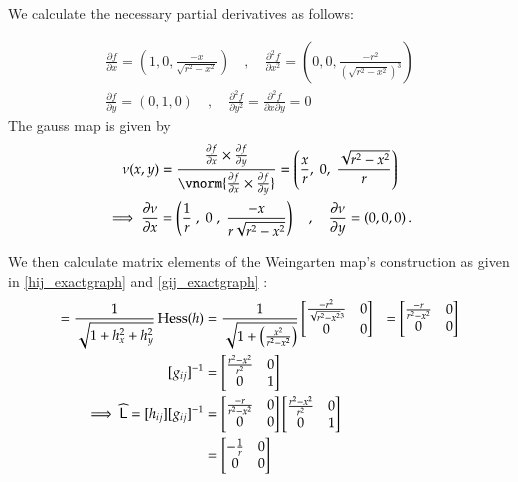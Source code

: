       We calculate the necessary partial derivatives as follows:
      
      \begin{gather}
      \frac{\partial f}{\partial x} = \left(1, 0, \frac{-x}{\sqrt{r^2 - x^2}}\right)
      \quad , \quad
      \frac{\partial^2 f}{\partial x^2} = \left(0, 0, \frac{-r^2}{\left(\sqrt{r^2 - x^2}\right)^3}\right) \\
      \frac{\partial f}{\partial y} = \left(0, 1, 0\right)
      \quad , \quad
      \frac{\partial^2 f}{\partial y^2} = \frac{\partial^2 f}{\partial x \partial y} = 0
      \end{gather}
      The gauss map is given by
      \begin{gather}
      \nu(x,y) = \frac{\frac{\partial f}{\partial x} \times \frac{\partial f}{\partial y}}
      {\vnorm{\frac{\partial f}{\partial x} \times \frac{\partial f}{\partial y}}}
      = \left( \frac{x}{r} ,\; 0 ,\; \frac{\sqrt{r^2 - x^2}}{r} \right) \\
	  \implies
	  \frac{\partial \nu}{\partial x}
		  = \left(\frac{1}{r} \;,\; 0\;,\; \frac{-x}{r\sqrt{r^2-x^2}}\right)
		  \quad , \quad \frac{\partial \nu}{\partial y} = \left(0,0,0\right).
      \end{gather}
      
      We then calculate matrix elements of the Weingarten map's construction as given in
      \cref{hij_exactgraph} and \cref{gij_exactgraph} :
      \begin{align}
      [h_{ij}] = \frac{1}{\sqrt{1+h_x^2 + h_y^2}} \,  \Hess (h)
		       &= \frac{1}{\sqrt{1+\left(\frac{x^2}{r^2-x^2}\right)}}
		       \begin{bmatrix}
		       \frac{-r^2}{\sqrt{r^2 - x^2}^3} & 0 \\
			     0 & 0
		       \end{bmatrix} 
		       &= \begin{bmatrix}
		       \frac{-r}{r^2 - x^2} & 0 \\
		       0 & 0
		       \end{bmatrix} \\
		       [g_{ij}]^{-1} &= \begin{bmatrix} \frac{r^2 - x^2}{r^2} & 0 \\ 0 & 1 \end{bmatrix} \\
		       \implies \weinmat = [h_{ij}]	[g_{ij}]^{-1} &=
		       \begin{bmatrix}
		       \frac{-r}{r^2 - x^2} & 0 \\
		       0 & 0
		       \end{bmatrix} \begin{bmatrix} \frac{r^2 - x^2}{r^2} & 0 \\ 0 & 1 \end{bmatrix} \\
		       &= \begin{bmatrix} - \frac{1}{r} & 0 \\ 0 & 0 	\end{bmatrix}	       	
      \end{align}
